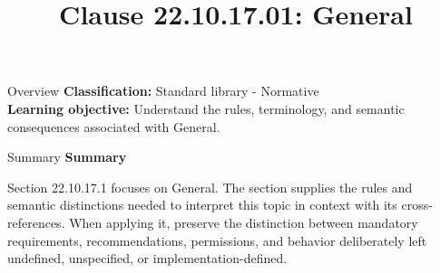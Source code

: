 \documentclass[10pt,letterpaper]{article}
\title{Clause 22.10.17.01: General}
\author{}
\date{}
\begin{document}
\maketitle
\begin{CornellOverviewBox}{Overview}
\textbf{Classification:} Standard library - Normative\\[2pt]
\textbf{Learning objective:} Understand the rules, terminology, and semantic consequences associated with General.
\end{CornellOverviewBox}\begin{CornellSummaryBox}{Summary}
{\sffamily\bfseries\color{Accent} Summary}\par\vspace{3pt}Section 22.10.17.1 focuses on General. The section supplies the rules and semantic distinctions needed to interpret this topic in context with its cross-references. When applying it, preserve the distinction between mandatory requirements, recommendations, permissions, and behavior deliberately left undefined, unspecified, or implementation-defined.
\end{CornellSummaryBox}
\end{document}
